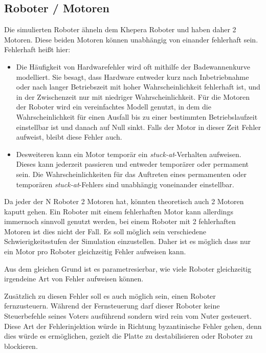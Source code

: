 \subsection{Roboter / Motoren}
Die simulierten Roboter {\"{a}}hneln dem Khepera Roboter und haben daher 2 Motoren. Diese beiden Motoren k{\"{o}}nnen unabh{\"{a}}ngig von einander fehlerhaft sein. Fehlerhaft
hei{\ss}t hier:
\begin{itemize}
	\item Die H{\"{a}}ufigkeit von Hardwarefehler wird oft mithilfe der Badewannenkurve modelliert. Sie besagt,
		dass Hardware entweder kurz nach Inbetriebnahme oder nach langer Betriebszeit mit hoher
		Wahrscheinlichkeit fehlerhaft ist, und in der Zwischenzeit nur mit niedriger Wahrscheinlichkeit.
		F{\"{u}}r die Motoren der Roboter wird ein vereinfachtes Modell genutzt, in dem die Wahrscheinlichkeit 
		f{\"{u}}r einen Ausfall bis zu einer bestimmten Betriebslaufzeit einstellbar ist und danach auf
		Null sinkt. Falls der Motor in dieser Zeit Fehler aufweist, bleibt diese Fehler auch.
	\item Desweiteren kann ein Motor tempor{\"{a}}r ein \textit{stuck-at}-Verhalten aufweisen. Dieses
		kann jederzeit passieren und entweder tempor{\"{a}}rer oder permament sein.
		Die Wahrscheinlichkeiten f{\"{u}}r das Auftreten eines permamenten oder tempor{\"{a}}ren
		\textit{stuck-at}-Fehlers sind unabh{\"{a}}ngig voneinander einstellbar.
\end{itemize}

Da jeder der \gls{N} Roboter 2 Motoren hat, k{\"{o}}nnten theoretisch auch 2 Motoren kaputt gehen. Ein Roboter mit einem fehlerhaften Motor kann allerdings immernoch sinnvoll genutzt werden,
bei einem Roboter mit 2 fehlerhaften Motoren ist dies nicht der Fall. Es soll m{\"{o}}glich sein verschiedene 
Schwierigkeitsstufen der Simulation einzustellen. Daher ist es m{\"{o}}glich
dass nur ein Motor pro Roboter gleichzeitig Fehler aufweisen kann.

Aus dem gleichen Grund ist es parametresierbar, wie viele Roboter gleichzeitig irgendeine Art von Fehler aufweisen k{\"{o}}nnen.

Zus{\"{a}}tzlich zu diesen Fehler soll es auch m{\"{o}}glich sein, einen Roboter fernzusteuern. W{\"{a}}hrend
der Fernsteuerung darf dieser Roboter keine Steuerbefehle seines Voters ausf{\"{u}}hrend sondern wird rein
vom Nuter gesteuert. Diese Art der Fehlerinjektion w{\"{u}}rde in Richtung byzantinische Fehler gehen,
denn dies w{\"{u}}rde es erm{\"{o}}glichen, gezielt die Platte zu destabilisieren oder Roboter zu
blockieren.

